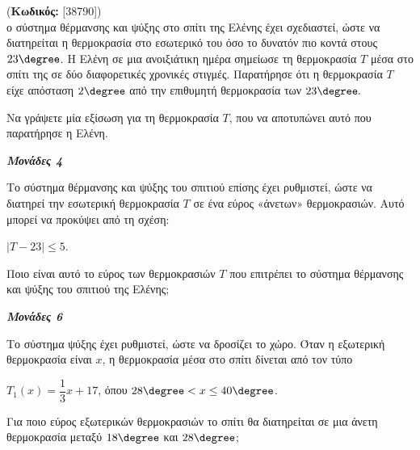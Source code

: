 \documentclass[11pt,a4paper,twoside]{book}
\newcounter{askhsh}[chapter]
\renewcommand{\theaskhsh}{
	\bf{\titlefont{\Large{\thechapter}}.\arabic{askhsh}}
}
\newcommand{\Askhsh}[2]{\refstepcounter{askhsh}{\titlefont{Άσκηση\theaskhsh} - \textcolor{maincolor}{ΘΕΜΑ #2}} (\small{\textbf{Κωδικός:} #1})\\}{}
\newcommand{\monades}[1]{
\hspace*{\fill}
\textbf{\textit{\textcolor{maincolor}{Μονάδες #1}}}}
\begin{document}
\vspace{4mm}

\Askhsh{[38790]}
Το σύστημα θέρμανσης και ψύξης στο σπίτι της Ελένης έχει σχεδιαστεί, ώστε να διατηρείται η θερμοκρασία στο εσωτερικό του όσο το δυνατόν πιο κοντά στους $23\degree$. Η Ελένη σε μια ανοιξιάτικη ημέρα σημείωσε τη θερμοκρασία $T$ μέσα στο σπίτι της σε δύο διαφορετικές χρονικές στιγμές. Παρατήρησε ότι η θερμοκρασία $T$ είχε απόσταση $2\degree$ από την επιθυμητή θερμοκρασία των $23\degree.$

\begin{alist}
\item Να γράψετε μία εξίσωση για τη θερμοκρασία $T$, που να αποτυπώνει αυτό που παρατήρησε η Ελένη.
\monades{4}
\item Το σύστημα θέρμανσης και ψύξης του σπιτιού επίσης έχει ρυθμιστεί, ώστε να διατηρεί την εσωτερική θερμοκρασία $T$ σε ένα εύρος «άνετων» θερμοκρασιών. Αυτό μπορεί να προκύψει από τη σχέση:

$|T - 23| \leq 5$.

Ποιο είναι αυτό το εύρος των θερμοκρασιών $T$ που επιτρέπει το σύστημα θέρμανσης και ψύξης του σπιτιού της Ελένης;
\monades{6}
\item Το σύστημα ψύξης έχει ρυθμιστεί, ώστε να δροσίζει το χώρο. Όταν η εξωτερική θερμοκρασία είναι $x$, η θερμοκρασία μέσα στο σπίτι δίνεται από τον τύπο

$T_1(x) = \dfrac{1}{3}x + 17$, όπου $28\degree < x \leq 40\degree$.

Για ποιο εύρος εξωτερικών θερμοκρασιών το σπίτι θα διατηρείται σε μια άνετη θερμοκρασία μεταξύ $18\degree$ και $28\degree$;

\begin{marginfigure}


\end{marginfigure}
\end{alist}
\end{document}
